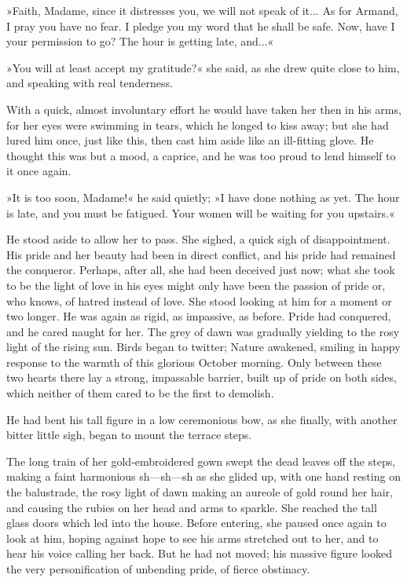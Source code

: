 »Faith, Madame, since it distresses you, we will not speak of it... As for Armand, I pray you have no fear. I pledge you my word that he shall be safe. Now, have I your permission to go? The hour is getting late, and...«

»You will at least accept my gratitude?« she said, as she drew quite close to him, and speaking with real tenderness.

With a quick, almost involuntary effort he would have taken her then in his arms, for her eyes were swimming in tears, which he longed to kiss away; but she had lured him once, just like this, then cast him aside like an ill-fitting glove. He thought this was but a mood, a caprice, and he was too proud to lend himself to it once again.

»It is too soon, Madame!« he said quietly; »I have done nothing as yet. The hour is late, and you must be fatigued. Your women will be waiting for you upstairs.«

He stood aside to allow her to pass. She sighed, a quick sigh of disappointment. His pride and her beauty had been in direct conflict, and his pride had remained the conqueror. Perhaps, after all, she had been deceived just now; what she took to be the light of love in his eyes might only have been the passion of pride or, who knows, of hatred instead of love. She stood looking at him for a moment or two longer. He was again as rigid, as impassive, as before. Pride had conquered, and he cared naught for her. The grey of dawn was gradually yielding to the rosy light of the rising sun. Birds began to twitter; Nature awakened, smiling in happy response to the warmth of this glorious October morning. Only between these two hearts there lay a strong, impassable barrier, built up of pride on both sides, which neither of them cared to be the first to demolish.

He had bent his tall figure in a low ceremonious bow, as she finally, with another bitter little sigh, began to mount the terrace steps.

The long train of her gold-embroidered gown swept the dead leaves off the steps, making a faint harmonious sh\allowbreak---\allowbreak sh\allowbreak---\allowbreak sh as she glided up, with one hand resting on the balustrade, the rosy light of dawn making an aureole of gold round her hair, and causing the rubies on her head and arms to sparkle. She reached the tall glass doors which led into the house. Before entering, she paused once again to look at him, hoping against hope to see his arms stretched out to her, and to hear his voice calling her back. But he had not moved; his massive figure looked the very personification of unbending pride, of fierce obstinacy.

